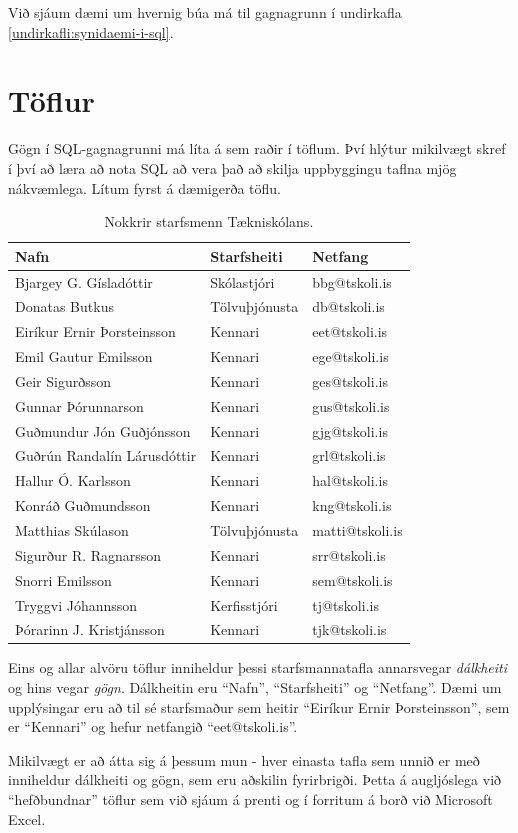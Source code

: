 Við sjáum dæmi um hvernig búa má til gagnagrunn í undirkafla \ref{undirkafli:synidaemi-i-sql}.
\section{Töflur}
Gögn í SQL-gagnagrunni má líta á sem raðir í töflum. Því hlýtur mikilvægt skref í því að læra að nota SQL að vera það að skilja uppbyggingu taflna mjög nákvæmlega.
Lítum fyrst á dæmigerða töflu.

\begin{table}
\centering
\caption[Nokkrir starfsmenn Tækniskólans]{Nokkrir starfsmenn Tækniskólans.}
\label{tafla:starfsmenn-ts}
\begin{tabular}{lll}
\toprule
Nafn&Starfsheiti&Netfang\\
\midrule
Bjargey G. Gísladóttir&Skólastjóri&bbg@tskoli.is\\
Donatas Butkus&Tölvuþjónusta&db@tskoli.is\\
Eiríkur Ernir Þorsteinsson&Kennari&eet@tskoli.is\\
Emil Gautur Emilsson&Kennari&ege@tskoli.is\\
Geir Sigurðsson&Kennari&ges@tskoli.is\\
Gunnar Þórunnarson&Kennari&gus@tskoli.is\\
Guðmundur Jón Guðjónsson&Kennari&gjg@tskoli.is\\
Guðrún Randalín Lárusdóttir&Kennari&grl@tskoli.is\\
Hallur Ó. Karlsson&Kennari&hal@tskoli.is\\
Konráð Guðmundsson&Kennari&kng@tskoli.is\\
Matthias Skúlason&Tölvuþjónusta&matti@tskoli.is\\
Sigurður R. Ragnarsson&Kennari&srr@tskoli.is\\
Snorri Emilsson&Kennari&sem@tskoli.is\\
Tryggvi Jóhannsson&Kerfisstjóri&tj@tskoli.is\\
Þórarinn J. Kristjánsson&Kennari&tjk@tskoli.is\\
\bottomrule
\end{tabular}
\end{table}
Eins og allar alvöru töflur inniheldur þessi starfsmannatafla annarsvegar \emph{dálkheiti} og hins vegar \emph{gögn}. Dálkheitin eru ``Nafn'', ``Starfsheiti'' og ``Netfang''. Dæmi um upplýsingar eru að til sé starfsmaður sem heitir ``Eiríkur Ernir Þorsteinsson'', sem er ``Kennari'' og hefur netfangið ``eet@tskoli.is''. 

Mikilvægt er að átta sig á þessum mun - hver einasta tafla sem unnið er með inniheldur dálkheiti og gögn, sem eru aðskilin fyrirbrigði. Þetta á augljóslega við ``hefðbundnar'' töflur sem við sjáum á prenti og í forritum á borð við Microsoft Excel. 

